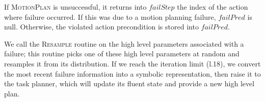 If \textsc{MotionPlan} is unsuccessful, it returns into $failStep$ the index of the action where failure occurred.
If this was due to a motion planning failure, $failPred$ is null. Otherwise,
the violated action precondition is stored into $failPred$.

We call the \textsc{Resample} routine on the high level parameters
associated with a failure; this routine picks one of these high level parameters at random and
resamples it from its distribution. If we reach the iteration limit (l.18),
we convert the most recent failure information into a symbolic representation, then raise it
to the task planner, which will update its fluent state and provide a new
high level plan.

